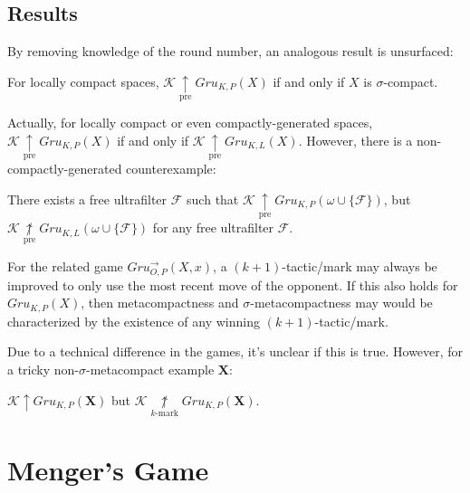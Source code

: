 \documentclass{beamer}
\theoremstyle{definition}
\newcommand{\win}{\uparrow}
\newcommand{\prewin}{\underset{\text{pre}}{\uparrow}}
\newcommand{\notprewin}{\underset{\text{pre}}{\not\uparrow}}
\newcommand{\notkmarkwin}[1]{\underset{#1\text{-mark}}{\not\uparrow}}
\newcommand{\gruConGame}[2]{Gru_{O,P}^{\to}\left({#1},{#2}\right)}
\newcommand{\gruKPGame}[1]{Gru_{K,P}\left({#1}\right)}
\newcommand{\gruKLGame}[1]{Gru_{K,L}\left({#1}\right)}
\newcommand{\<}{\langle}
\renewcommand{\>}{\rangle}
\newcommand{\mc}[1]{\mathcal{#1}}
\newcommand{\pl}[1]{\mathscr{#1}}
\begin{document}
\subsection{Results}

\begin{frame}
  By removing knowledge of the round number, an analogous result is
  unsurfaced:

  \begin{theorem}
    For locally compact spaces, $\pl K\prewin\gruKPGame{X}$ if and only if
    $X$ is $\sigma$-compact.
  \end{theorem}

  \pause

  Actually, for locally compact or even compactly-generated spaces,
  $\pl K\prewin\gruKPGame{X}$ if and only if $\pl K\prewin\gruKLGame{X}$.
  However, there is a non-compactly-generated counterexample:

  \begin{theorem}
    There exists a free ultrafilter $\mc F$ such that
    $\pl K \prewin\gruKPGame{\omega\cup\{\mc F\}}$, but
    $\pl K \notprewin\gruKLGame{\omega\cup\{\mc F\}}$ for any free
    ultrafilter $\mc F$.
  \end{theorem}
\end{frame}

\begin{frame}
  For the related game $\gruConGame{X}{x}$, a $(k+1)$-tactic/mark may always
  be improved to only use the most recent move of the opponent. If this
  also holds for $\gruKPGame{X}$, then metacompactness and
  $\sigma$-metacompactness may would be characterized by the existence
  of any winning $(k+1)$-tactic/mark.

  \vpause

  Due to a technical difference in the games, it's unclear if this is true.
  However, for a tricky non-$\sigma$-metacompact example $\pmb X$:

  \begin{theorem}
    $\pl K\win\gruKPGame{\pmb X}$ but
    $\pl K\notkmarkwin{k}\gruKPGame{\pmb X}$.
  \end{theorem}
\end{frame}





\section{Menger's Game}
\end{document}
